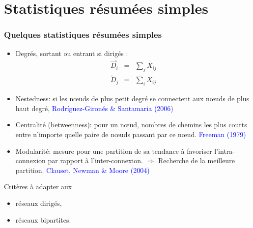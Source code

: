 \documentclass[nopagenumber,9pt]{beamer}
\begin{document}
\section{Statistiques résumées simples}

\begin{frame}
\frametitle{Quelques statistiques résumées simples}


\begin{itemize}

\item Degrés, sortant ou entrant si dirigés :
\begin{eqnarray*}
 \overrightarrow{D}_i&=&\sum_j X_{ij}\\
 \overleftarrow{D}_j&=&\sum_i X_{ij}
\end{eqnarray*}

\item Nestedness: si les n\oe uds de plus petit degré se connectent aux n\oe uds de plus haut degré,
\textcolor{blue}{Rodríguez-Gironés \& Santamaria (2006)}

\item Centralité (betweenness): pour un n\oe ud, nombres de chemins les plus courts entre n'importe quelle paire de n\oe uds passant par ce n\oe ud.
\textcolor{blue}{Freeman (1979)}

\item Modularité: mesure pour une partition de sa tendance à favoriser l'intra-connexion par rapport à l'inter-connexion.
$\Rightarrow$ Recherche de la meilleure partition. 
\textcolor{blue}{Clauset, Newman \& Moore (2004)}
\end{itemize}


\bigskip

Critères à adapter aux
\begin{itemize}
 \item réseaux dirigés,
 \item réseaux bipartites.
\end{itemize}

\bigskip



\end{frame}
\end{document}
